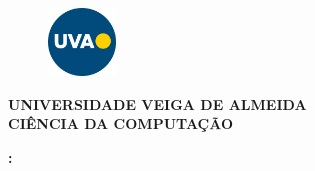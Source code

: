 \begin{titlepage}
    
    \centering
    
    \begin{figure}[h]
        \centering
        \includegraphics[width=1.8cm]{Figuras/uva.png}
    \end{figure}
        
    \textbf{
        \uppercase{
            Universidade Veiga de Almeida \\
            Ciência da Computação
        }
    }
    \vspace{5 em}

    \printAuthors
    
    
    \vfill

    \textbf{\uppercase\expandafter{\expanded{\TitleName}:}} \\
    \SubtitleName
    
        
    \vfill 
        
    \printCity \\
    \the \year

\end{titlepage}

